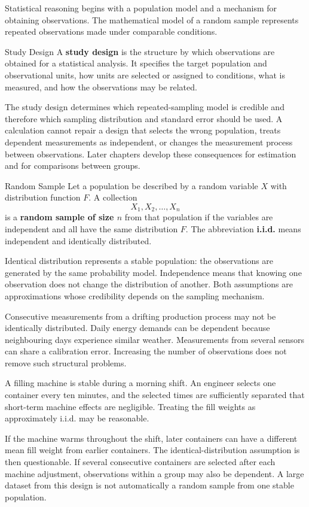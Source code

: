 Statistical reasoning begins with a population model and a mechanism for obtaining observations. The mathematical model of a random sample represents repeated observations made under comparable conditions.

\begin{definition}{Study Design}
A \textbf{study design} is the structure by which observations are obtained for a statistical analysis. It specifies the target population and observational units, how units are selected or assigned to conditions, what is measured, and how the observations may be related.
\end{definition}

The study design determines which repeated-sampling model is credible and therefore which sampling distribution and standard error should be used. A calculation cannot repair a design that selects the wrong population, treats dependent measurements as independent, or changes the measurement process between observations. Later chapters develop these consequences for estimation and for comparisons between groups.

\begin{definition}{Random Sample}
Let a population be described by a random variable $X$ with distribution function $F$. A collection
\[
    X_1,X_2,\ldots,X_n
\]
is a \textbf{random sample of size $n$} from that population if the variables are independent and all have the same distribution $F$. The abbreviation \textbf{i.i.d.} means independent and identically distributed.
\end{definition}

Identical distribution represents a stable population: the observations are generated by the same probability model. Independence means that knowing one observation does not change the distribution of another. Both assumptions are approximations whose credibility depends on the sampling mechanism.

Consecutive measurements from a drifting production process may not be identically distributed. Daily energy demands can be dependent because neighbouring days experience similar weather. Measurements from several sensors can share a calibration error. Increasing the number of observations does not remove such structural problems.

\begin{example}\par
A filling machine is stable during a morning shift. An engineer selects one container every ten minutes, and the selected times are sufficiently separated that short-term machine effects are negligible. Treating the fill weights as approximately i.i.d. may be reasonable.

If the machine warms throughout the shift, later containers can have a different mean fill weight from earlier containers. The identical-distribution assumption is then questionable. If several consecutive containers are selected after each machine adjustment, observations within a group may also be dependent. A large dataset from this design is not automatically a random sample from one stable population.
\end{example}

